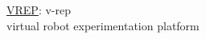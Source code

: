 \begin{thebibliography}{9}

 \href{http://www.coppeliarobotics.com/}{VREP}: v-rep\\
	virtual robot experimentation platform

\end{thebibliography}
